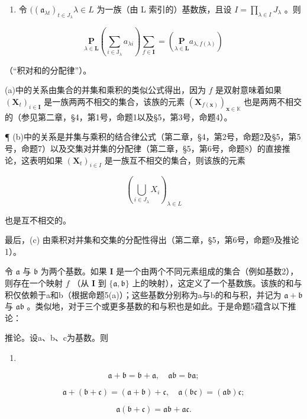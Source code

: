 \begin{enumerate}
\def\labelenumi{(\alph{enumi})}
\setcounter{enumi}{2}
\tightlist
\item
  令 \(((\mathfrak{a}_{\lambda t})_{t\in J_{\lambda}}\lambda \in L\) 为一族（由 L 索引的）基数族，且设 \(I = \prod_{\lambda \in I}J_{\lambda}\) 。则
\end{enumerate}

\[
\underset {\lambda \in \mathbf {L}} {\mathbf {P}} \left(\sum_ {i \in \mathrm{J} _ {\lambda}} a _ {\lambda i}\right) \underset {f \in \mathbf {I}} {\sum} = \left(\underset {\lambda \in \mathbf {L}} {\mathbf {P}} a _ {\lambda , f (\lambda)}\right)
\]

（“积对和的分配律”）。

(a)中的关系由集合的并集和乘积的类似公式得出，因为 \(f\) 是双射意味着如果 \((\mathbf{X}_t)_{i \in \mathbf{I}}\) 是一族两两不相交的集合，该族的元素 \((\mathbf{X}_{f(\mathbf{x})})_{\mathbf{x} \in \mathbb{K}}\) 也是两两不相交的（参见第二章，§4，第1号，命题1以及§5，第3号，命题4）。

¶ (b)中的关系是并集与乘积的结合律公式（第二章，§4，第2号，命题2及§5，第5号，命题7）以及交集对并集的分配律（第二章，§5，第6号，命题8）的直接推论，这表明如果 \((\mathbf{X}_{t})_{i\in I}\) 是一族互不相交的集合，则该族的元素

\[
\left(\bigcup_ {i \in J _ {\lambda}} X _ {i}\right) _ {\lambda \in L}
\]

也是互不相交的。

最后，(c) 由乘积对并集和交集的分配性得出（第二章，§5，第6号，命题9及推论1）。

令 \(\mathfrak{a}\) 与 \(\mathfrak{b}\) 为两个基数。如果 \(\mathbf{I}\) 是一个由两个不同元素组成的集合（例如基数2），则存在一个映射 \(f\) （从 \(\mathbf{I}\) 到 \(\{\mathfrak{a}, \mathfrak{b}\}\) 上的映射），这定义了一个基数族。该族的和与积仅依赖于a和b（根据命题5(a)）；这些基数分别称为a与b的和与积，并记为 \(\mathfrak{a} + \mathfrak{b}\) 与 \(\mathfrak{a}\mathfrak{b}\) 。类似地，对于三个或更多基数的和与积也是如此。于是命题5蕴含以下推论：

推论。设a、b、c为基数。则

\begin{enumerate}
\def\labelenumi{(\arabic{enumi})}
\tightlist
\item
\end{enumerate}

\[
\mathfrak {a} + \mathfrak {b} = \mathfrak {b} + \mathfrak {a}, \quad \mathfrak {a}\mathfrak {b} = \mathfrak {b}\mathfrak {a};\tag{2}
\]

\[
\mathfrak {a} + (\mathfrak {b} + \mathfrak {c}) = (\mathfrak {a} + \mathfrak {b}) + \mathfrak {c}, \quad \mathfrak {a}(\mathfrak {b}\mathfrak {c}) = (\mathfrak {a}\mathfrak {b})\mathfrak {c};\tag{3}
\]

\[
\mathfrak {a} (\mathfrak {b} + \mathfrak {c}) = \mathfrak {a}\mathfrak {b} + \mathfrak {a}\mathfrak {c}.
\]

